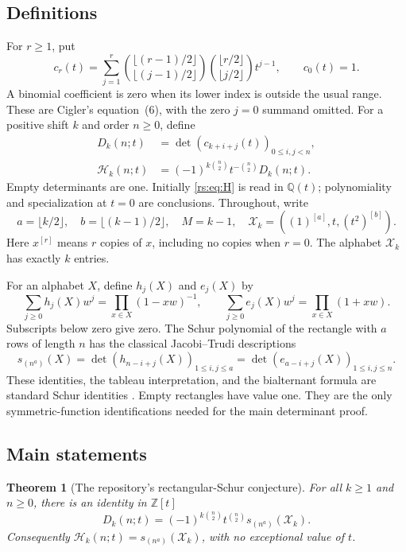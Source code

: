 \documentclass[11pt]{article}
\newtheorem{theorem}{Theorem}[section]
\theoremstyle{definition}
\theoremstyle{remark}
\newcommand{\Z}{\mathbb Z}
\newcommand{\Q}{\mathbb Q}
\newcommand{\Ht}{\mathcal H}
\newcommand{\XX}{\mathcal X}
\newcommand{\rep}[2]{(#1)^{[#2]}}
\theoremstyle{definition}
\theoremstyle{plain}
\numberwithin{equation}{section}
\begin{document}
\subsection{Definitions}
For $r\ge1$, put
\begin{equation}
 c_r(t)=\sum_{j=1}^{r}
 \binom{\lfloor(r-1)/2\rfloor}{\lfloor(j-1)/2\rfloor}
 \binom{\lfloor r/2\rfloor}{\lfloor j/2\rfloor}t^{j-1},
 \qquad c_0(t)=1.
 \label{rs:eq:moments}
\end{equation}
A binomial coefficient is zero when its lower index is outside the usual
range. These are Cigler's equation~(6), with the zero $j=0$ summand omitted.
For a positive shift $k$ and order $n\ge0$, define
\begin{align}
 D_k(n;t)&=\det(c_{k+i+j}(t))_{0\le i,j<n},\label{rs:eq:D}\\
 \Ht_k(n;t)&=(-1)^{k\binom n2}t^{-\binom n2}D_k(n;t).
 \label{rs:eq:H}
\end{align}
Empty determinants are one. Initially \eqref{rs:eq:H} is read in $\Q(t)$;
polynomiality and specialization at $t=0$ are conclusions.
Throughout, write
\begin{equation}
 a=\lfloor k/2\rfloor,\quad b=\lfloor(k-1)/2\rfloor,\quad
 M=k-1,\quad \XX_k=(\rep1a,t,\rep{t^2}b).
 \label{rs:eq:ab}
\end{equation}
Here $x^{[r]}$ means $r$ copies of $x$, including no copies when $r=0$.
The alphabet $\XX_k$ has exactly $k$ entries.

For an alphabet $X$, define $h_j(X)$ and $e_j(X)$ by
\begin{equation}
 \sum_{j\ge0}h_j(X)w^j=\prod_{x\in X}(1-xw)^{-1},\qquad
 \sum_{j\ge0}e_j(X)w^j=\prod_{x\in X}(1+xw).
 \label{rs:eq:symmetric}
\end{equation}
Subscripts below zero give zero. The Schur polynomial of the rectangle with
$a$ rows of length $n$ has the classical Jacobi--Trudi descriptions
\begin{equation}
 s_{(n^a)}(X)=\det(h_{n-i+j}(X))_{1\le i,j\le a}
 =\det(e_{a-i+j}(X))_{1\le i,j\le n}.
 \label{rs:eq:JT}
\end{equation}
These identities, the tableau interpretation, and the bialternant formula
are standard Schur identities \cite{Fulton,GSM}. Empty rectangles have value
one. They are the only symmetric-function identifications needed for the
main determinant proof.

\subsection{Main statements}
\begin{theorem}[The repository's rectangular-Schur conjecture]
\label{rs:thm:schur}
For all $k\ge1$ and $n\ge0$, there is an identity in $\Z[t]$
\begin{equation}
 \boxed{D_k(n;t)=(-1)^{k\binom n2}t^{\binom n2}
                 s_{(n^a)}(\XX_k).}
 \label{rs:eq:main}
\end{equation}
Consequently $\Ht_k(n;t)=s_{(n^a)}(\XX_k)$, with no exceptional value of $t$.
\end{theorem}
\end{document}
